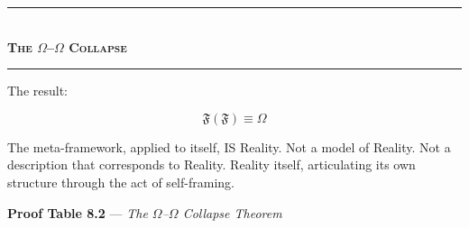 \documentclass[10pt, openany, oneside]{book}
\renewcommand{\normalsize}{\fontsize{10}{13}\selectfont}
\begin{document}
\vspace{1.5em}


\begin{center}
    \rule{0.3\textwidth}{0.4pt}\\[0.5em]
    {\normalsize\bfseries\scshape The $\Omega$--$\Omega$ Collapse}\\[0.3em]
    \rule{0.3\textwidth}{0.4pt}
\end{center}

\vspace{1em}

\noindent The result:

$$\boxed{\mathfrak{F}(\mathfrak{F}) \equiv \Omega}$$

The meta-framework, applied to itself, IS Reality. Not a model of Reality. Not a description that corresponds to Reality. Reality itself, articulating its own structure through the act of self-framing.

\vspace{0.5em}

\textbf{Proof Table 8.2} --- \textit{The $\Omega$--$\Omega$ Collapse Theorem}

\vspace{0.5em}
\end{document}
